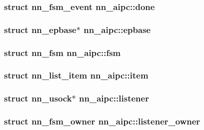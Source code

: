 \subsubsection[{done}]{\setlength{\rightskip}{0pt plus 5cm}struct {\bf nn\+\_\+fsm\+\_\+event} nn\+\_\+aipc\+::done}\hypertarget{structnn__aipc_ae4f441d4718a9fc65b30165f36ab28ac}{}\label{structnn__aipc_ae4f441d4718a9fc65b30165f36ab28ac}
\subsubsection[{epbase}]{\setlength{\rightskip}{0pt plus 5cm}struct {\bf nn\+\_\+epbase}$\ast$ nn\+\_\+aipc\+::epbase}\hypertarget{structnn__aipc_a25f1490e7a0246887156d2fbd12a2b80}{}\label{structnn__aipc_a25f1490e7a0246887156d2fbd12a2b80}
\subsubsection[{fsm}]{\setlength{\rightskip}{0pt plus 5cm}struct {\bf nn\+\_\+fsm} nn\+\_\+aipc\+::fsm}\hypertarget{structnn__aipc_af9e3aa7a9621f8dd9fbfe0b862dcdc89}{}\label{structnn__aipc_af9e3aa7a9621f8dd9fbfe0b862dcdc89}
\subsubsection[{item}]{\setlength{\rightskip}{0pt plus 5cm}struct {\bf nn\+\_\+list\+\_\+item} nn\+\_\+aipc\+::item}\hypertarget{structnn__aipc_aa406a6c84762843d34f8db2c0975f3cd}{}\label{structnn__aipc_aa406a6c84762843d34f8db2c0975f3cd}
\subsubsection[{listener}]{\setlength{\rightskip}{0pt plus 5cm}struct {\bf nn\+\_\+usock}$\ast$ nn\+\_\+aipc\+::listener}\hypertarget{structnn__aipc_a008ab3a69a055c4744d6ee21042918ae}{}\label{structnn__aipc_a008ab3a69a055c4744d6ee21042918ae}
\subsubsection[{listener\+\_\+owner}]{\setlength{\rightskip}{0pt plus 5cm}struct {\bf nn\+\_\+fsm\+\_\+owner} nn\+\_\+aipc\+::listener\+\_\+owner}\hypertarget{structnn__aipc_a5a59d11eb014b4f1eb7982d762f0e524}{}\label{structnn__aipc_a5a59d11eb014b4f1eb7982d762f0e524}
